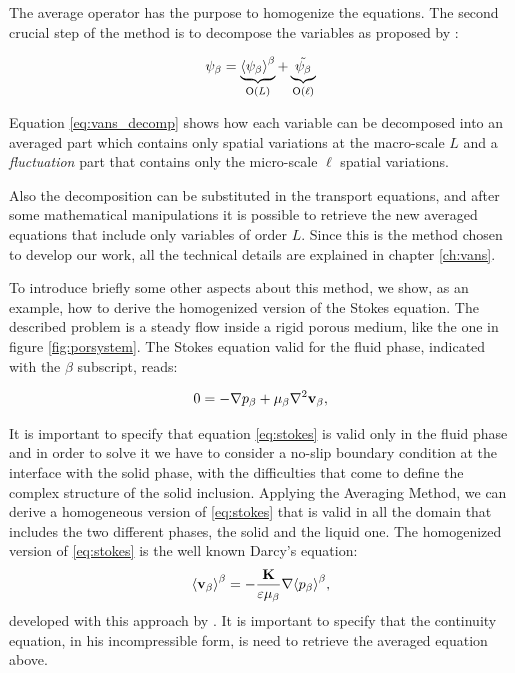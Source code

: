 The average operator has the purpose to homogenize the equations. The second crucial step of the method is to decompose the variables as proposed by \citet{gray1975derivation}:

\begin{equation}
\psi_{\beta} =   \underbrace{ {\left< \psi_{\beta} \right>}^{\beta} }_\text{O($L$)}  +  \underbrace{\tilde{\psi_{\beta}} }_\text{O($\ell$)}
\label{eq:vans_decomp}
\end{equation}

\noindent Equation \eqref{eq:vans_decomp} shows how each variable can be decomposed into an averaged part which contains only spatial variations at the macro-scale $L$ and a \textit{fluctuation} part that contains only the micro-scale $\ell$ spatial variations.

Also the decomposition can be substituted in the transport equations, and after some mathematical manipulations it is possible to retrieve the new averaged equations that include only variables of order $L$.
Since this is the method chosen to develop our work, all the technical details are explained in chapter \ref{ch:vans}.

To introduce briefly some other aspects about this method, we show, as an example, how to derive the homogenized version of the Stokes equation. The described problem is a steady flow inside a rigid porous medium, like the one in figure \ref{fig:porsystem}.
The Stokes equation valid for the fluid phase, indicated with the $\beta$ subscript, reads:

\begin{equation}
0 = - \nabla p_{\beta} +\mu_{\beta} \nabla^2 \textbf{v}_{\beta},
\label{eq:stokes}
\end{equation} 

It is important to specify that equation \eqref{eq:stokes} is valid only in the fluid phase and in order to solve it we have to consider a no-slip boundary condition at the interface with the solid phase, with the difficulties that come to define the complex structure of the solid inclusion.
Applying the Averaging Method, we can derive a homogeneous version of \eqref{eq:stokes} that is valid in all the domain that includes the two different phases, the solid and the liquid one.
The homogenized version of \eqref{eq:stokes} is the well known Darcy's equation:
$${\left< \textbf{v}_{\beta} \right>}^{\beta} = -\dfrac{ \mathbf{K} }{\varepsilon \mu_{\beta}} \nabla {\left< p_{\beta} \right>}^{\beta},$$
developed with this approach by  \citet{whitaker1986flow}. It is important to specify that the continuity equation, in his incompressible form, is need to retrieve the averaged equation above.

